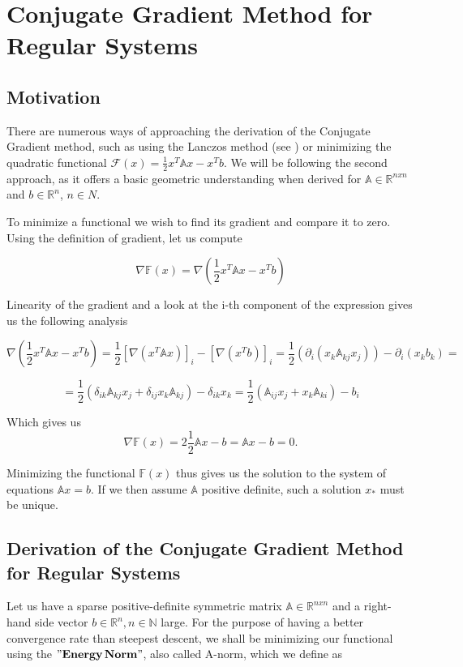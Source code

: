 \chapter{Conjugate Gradient Method for Regular Systems}

\section{Motivation}

There are numerous ways of approaching the derivation of the Conjugate Gradient method, such as using the Lanczos method (see \cite{vanderVorst03}) or minimizing the quadratic functional \(\mathcal{F}(x)=\frac{1}{2}x^{T}\mathbb{A}x - x^{T}b\). We will be following the second approach, as it offers a basic geometric understanding when derived for \(\mathbb{A}\in{\mathbb{R}^{nxn}}\) and \(b\in\mathbb{R}^n\), \(n\in{N}\). 

\indent To minimize a functional we wish to find its gradient and compare it to zero. Using the definition of gradient, let us compute 

\[\nabla{\mathbb{F}(x)} = \nabla{(\frac{1}{2}x^{T}\mathbb{A}x - x^{T}b)}\]

Linearity of the gradient and a look at the i-th component of the expression gives us the following analysis

\[\nabla{(\frac{1}{2}x^{T}\mathbb{A}x - x^{T}b)}=\frac{1}{2}[\nabla{(x^T\mathbb{A}x)}]_{i} - [\nabla{(x^Tb)}]_i = \frac{1}{2}(\partial_i(x_k\mathbb{A}_{kj}x_j)) - \partial_i(x_kb_k) =\]

\[= \frac{1}{2}(\delta_{ik}\mathbb{A}_{kj}x_j + \delta_{ij}x_k\mathbb{A}_{kj}) -\delta_{ik}x_k = \frac{1}{2}(\mathbb{A}_{ij}x_j + x_k\mathbb{A}_{ki}) - b_i \]


Which gives us 
\begin{equation}\label{1.1}
    \nabla\mathbb{F}(x)=2\frac{1}{2}\mathbb{A}x - b = \mathbb{A}x - b = 0.
\end{equation}

Minimizing the functional \(\mathbb{F}(x)\) thus gives us the solution to the system of equations \(\mathbb{A}x = b\). If we then assume \(\mathbb{A}\) positive definite, such a solution \(x_*\) must be unique.


\section{Derivation of the Conjugate Gradient Method for Regular Systems}


Let us have a sparse positive-definite symmetric matrix \(\mathbb{A}\in\mathbb{R}^{nxn} \) and a right-hand side vector \(b\in\mathbb{R}^n, n\in\mathbb{N} \) large. For the purpose of having a better convergence rate than steepest descent, we shall be minimizing our functional using the \(\bold{"Energy\,Norm"}\), also called A-norm, which we define as 

